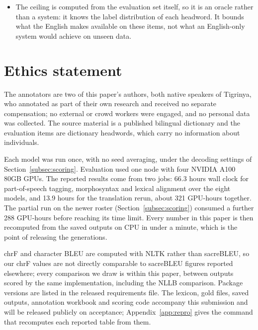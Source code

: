 \documentclass[11pt]{article}
\begin{document}
\begin{itemize}
    items have a headword the gloss leaves ambiguous. This is a property of
    the task design, not
    of the models, and it bounds what any result on these tasks can mean. A
    task that withheld the gloss, or that drew its items from the ambiguous
    subset, would measure something the English does not already determine;
    we have not run that experiment.
  \item The ceiling is computed from the evaluation set itself, so it is an
    oracle rather than a system: it knows the label distribution of each
    headword. It bounds what the English makes available on these items, not
    what an English-only system would achieve on unseen data.
\end{itemize}

\section*{Ethics statement}

The annotators are two of this paper's authors, both native speakers of
Tigrinya, who annotated as part of their own research and received no
separate compensation; no external or crowd workers were engaged, and no
personal data was collected. The source material is a published bilingual
dictionary and the evaluation items are dictionary headwords, which carry no
information about individuals.

Each model was run once, with no seed averaging, under the decoding settings
of Section~\ref{subsec:scoring}. Evaluation used one node with four NVIDIA
A100 80GB GPUs. The reported results come from two jobs: 66.3 hours wall
clock for part-of-speech tagging, morphosyntax and lexical alignment over
the eight models, and 13.9 hours for the translation rerun, about 321
GPU-hours together. The partial run on the newer roster
(Section~\ref{subsec:scoring}) consumed a further 288 GPU-hours before
reaching its time limit. Every number in this paper is then recomputed from
the saved outputs on CPU in under a minute, which is the point of releasing
the generations.

chrF and character BLEU are computed with NLTK rather than sacreBLEU, so our
chrF values are not directly comparable to sacreBLEU figures reported
elsewhere; every comparison we draw is within this paper, between outputs
scored by the same implementation, including the NLLB comparison. Package
versions are listed in the released requirements file. The lexicon, gold files, saved
outputs, annotation workbook and scoring code accompany this submission and
will be released publicly on acceptance; Appendix~\ref{app:repro} gives the
command that recomputes each reported table from them.
\end{document}
